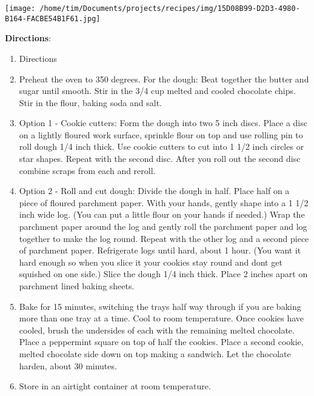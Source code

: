 \documentclass[11pt, twoside, openany]{book}
\begin{document}
\begin{minipage}[t]{0.2\linewidth}
\centering \strut\vspace*{-\baselineskip}\newline
\texttt{[image: /home/tim/Documents/projects/recipes/img/15D08B99-D2D3-4980-B164-FACBE54B1F61.jpg]}\\
\end{minipage}\vspace{3mm}
\textbf{Directions}:
\vspace{-3mm}\begin{enumerate}\setlength\itemsep{-1mm}
\item Directions
\item Preheat the oven to 350 degrees. For the dough: Beat together the butter and sugar until smooth. Stir in the 3/4 cup melted and cooled chocolate chips. Stir in the flour, baking soda and salt.
\item Option 1 - Cookie cutters: Form the dough into two 5 inch discs. Place a disc on a lightly floured work surface, sprinkle flour on top and use rolling pin to roll dough 1/4 inch thick. Use cookie cutters to cut into 1 1/2 inch circles or star shapes. Repeat with the second disc. After you roll out the second disc combine scraps from each and reroll.
\item Option 2 - Roll and cut dough: Divide the dough in half. Place half on a piece of floured parchment paper. With your hands, gently shape into a 1 1/2 inch wide log. (You can put a little flour on your hands if needed.) Wrap the parchment paper around the log and gently roll the parchment paper and log together to make the log round. Repeat with the other log and a second piece of parchment paper. Refrigerate logs until hard, about 1 hour. (You want it hard enough so when you slice it your cookies stay round and dont get squished on one side.) Slice the dough 1/4 inch thick. Place 2 inches apart on parchment lined baking sheets.
\item Bake for 15 minutes, switching the trays half way through if you are baking more than one tray at a time. Cool to room temperature. Once cookies have cooled, brush the undersides of each with the remaining melted chocolate. Place a peppermint square on top of half the cookies. Place a second cookie, melted chocolate side down on top making a sandwich. Let the chocolate harden, about 30 minutes.
\item Store in an airtight container at room temperature.
\end{enumerate}
\end{document}
